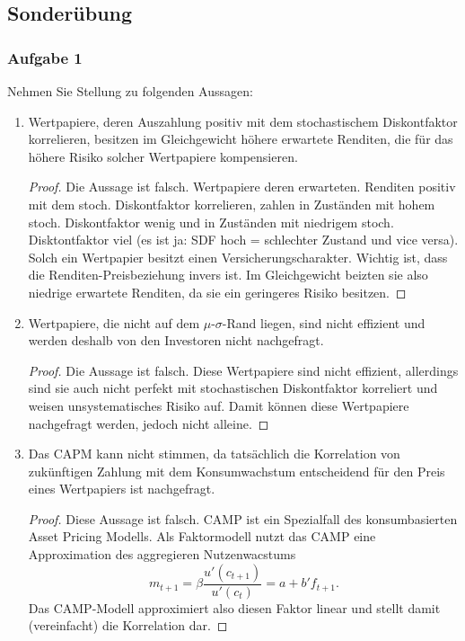 \documentclass[12pt]{extreport} %
\theoremstyle{named}
\theoremstyle{nnamed}
\theoremstyle{itshape}
\theoremstyle{normal}
\begin{document}
\newpage

\subsection*{Sonderübung}

\subsubsection*{Aufgabe 1}
Nehmen Sie Stellung zu folgenden Aussagen:
\begin{enumerate}
	\item Wertpapiere, deren Auszahlung positiv mit dem stochastischem Diskontfaktor  korrelieren, besitzen im Gleichgewicht höhere erwartete Renditen, die für das höhere Risiko solcher Wertpapiere kompensieren.
		\begin{proof}
			Die Aussage ist falsch. Wertpapiere deren erwarteten. Renditen positiv mit dem stoch. Diskontfaktor korrelieren, zahlen in Zuständen mit hohem stoch. Diskontfaktor wenig und in Zuständen mit niedrigem stoch. Disktontfaktor viel (es ist ja: SDF hoch = schlechter Zustand und vice versa). Solch ein Wertpapier besitzt einen Versicherungscharakter. Wichtig ist, dass die Renditen-Preisbeziehung invers ist. Im Gleichgewicht beizten sie also niedrige erwartete Renditen, da sie ein geringeres Risiko besitzen.
		\end{proof}
	\item Wertpapiere, die nicht auf dem $\mu$-$\sigma$-Rand liegen, sind nicht effizient und werden deshalb von den Investoren nicht nachgefragt.
		\begin{proof}
			Die Aussage ist falsch. Diese Wertpapiere sind nicht effizient, allerdings sind sie auch nicht perfekt mit stochastischen Diskontfaktor korreliert und weisen unsystematisches Risiko auf. Damit können diese Wertpapiere nachgefragt werden, jedoch nicht alleine.
		\end{proof}
	\item Das CAPM kann nicht stimmen, da tatsächlich die Korrelation von zukünftigen Zahlung mit dem Konsumwachstum entscheidend für den Preis eines Wertpapiers ist nachgefragt.
		\begin{proof}
			Diese Aussage ist falsch. CAMP ist ein Spezialfall des konsumbasierten Asset Pricing Modells. Als Faktormodell nutzt das CAMP eine Approximation des aggregieren Nutzenwacstums
			$$ m_{t+1} = \beta \frac{u'(c_{t+1})}{u'(c_{t})} = a + b' f_{t+1}. $$ 
			Das CAMP-Modell approximiert also diesen Faktor linear und  stellt damit (vereinfacht) die Korrelation dar.

\end{proof}
\end{enumerate}
\end{document}

